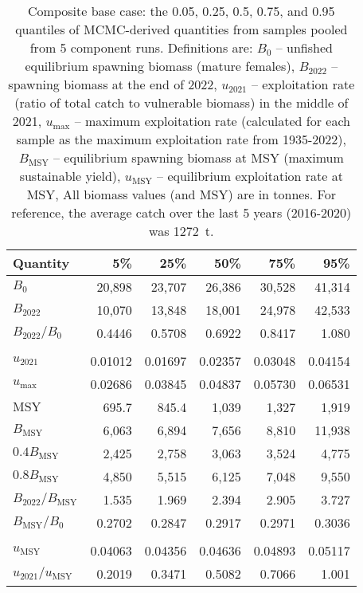 \documentclass[11pt]{book}
\newcommand{\Bmsy}{B_\text{MSY}}
\newcommand{\umsy}{u_\text{MSY}}
\begin{document}
\begin{table}[ht]
\centering
\caption{Composite base case: the 0.05, 0.25, 0.5, 0.75, and 0.95 quantiles of MCMC-derived quantities from \Nbase samples pooled from 5 component runs. Definitions are: $B_0$ -- unfished equilibrium spawning biomass (mature females), $B_{2022}$ -- spawning biomass at the end of 2022, $u_{2021}$ -- exploitation rate (ratio of total catch to vulnerable biomass) in the middle of 2021, $u_\text{max}$ -- maximum exploitation rate (calculated for each sample as the maximum exploitation rate from 1935-2022), $\Bmsy$ -- equilibrium spawning biomass at MSY (maximum sustainable yield), $\umsy$ -- equilibrium exploitation rate at MSY, All biomass values (and MSY) are in tonnes. For reference, the average catch over the last 5 years (2016-2020) was 1272~t.} 
\label{tab:ymr.base.rfpt}
\begin{tabular}{lrrrrr}
  \\[-1.0ex] \hline
Quantity & 5\% & 25\% & 50\% & 75\% & 95\% \\ 
  \hline
$B_{0}$ & 20,898 & 23,707 & 26,386 & 30,528 & 41,314 \\ 
  $B_{2022}$ & 10,070 & 13,848 & 18,001 & 24,978 & 42,533 \\ 
  $B_{2022}/B_{0}$ & 0.4446 & 0.5708 & 0.6922 & 0.8417 & 1.080 \\ 
   \hdashline \\[-1.75ex]$u_{2021}$ & 0.01012 & 0.01697 & 0.02357 & 0.03048 & 0.04154 \\ 
  $u_\text{max}$ & 0.02686 & 0.03845 & 0.04837 & 0.05730 & 0.06531 \\ 
   \hline
$\text{MSY}$ & 695.7 & 845.4 & 1,039 & 1,327 & 1,919 \\ 
  $\Bmsy$ & 6,063 & 6,894 & 7,656 & 8,810 & 11,938 \\ 
  $0.4\Bmsy$ & 2,425 & 2,758 & 3,063 & 3,524 & 4,775 \\ 
  $0.8\Bmsy$ & 4,850 & 5,515 & 6,125 & 7,048 & 9,550 \\ 
  $B_{2022}/\Bmsy$ & 1.535 & 1.969 & 2.394 & 2.905 & 3.727 \\ 
  $\Bmsy/B_{0}$ & 0.2702 & 0.2847 & 0.2917 & 0.2971 & 0.3036 \\ 
   \hdashline \\[-1.75ex]$\umsy$ & 0.04063 & 0.04356 & 0.04636 & 0.04893 & 0.05117 \\ 
  $u_{2021}/\umsy$ & 0.2019 & 0.3471 & 0.5082 & 0.7066 & 1.001 \\ 
   \hline
\end{tabular}
\end{table}
\setlength{\tabcolsep}{2pt}
\begin{landscapepage}{


}{\LH}{\RH}{\LF}{\RF} \end{landscapepage}
\end{document}
